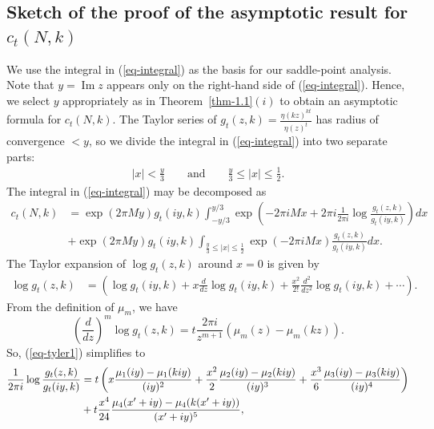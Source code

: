 \documentclass[11pt]{amsart}
\theoremstyle{plain}
\renewcommand{\Im}{\operatorname{Im}}
\numberwithin{equation}{section}
\begin{document}
	\subsection{\texorpdfstring{Sketch of the proof of the asymptotic result for $c_t(N,k)$}{}} 
	We use the integral in (\ref{eq-integral}) as the basis for our saddle-point analysis. 
	Note that $y=\Im z$ appears only on the right-hand side of (\ref{eq-integral}).
	Hence, we select $y$ appropriately as in Theorem~\ref{thm-1.1}$(i)$ to obtain an asymptotic formula for $c_t(N,k)$. 
	The Taylor series of $g_{t}(z,k)=\frac{\eta(kz)^{kt}}{\eta(z)^{t}}$ has radius of convergence $<y$, so we divide the integral in (\ref{eq-integral}) into two separate parts:
	\begin{align*}
		|x| < \frac{y}{3} 
		\qquad \text{and} \qquad 
		\frac{y}{3} \le |x| \le \frac{1}{2}.
	\end{align*}
	The integral in (\ref{eq-integral}) may be decomposed as
	\begin{equation}
		\begin{aligned}\label{eq-ptN1}
			c_{t}(N,k)&=\exp(2\pi My)g_{t}(iy,k)\int_{-y/3}^{y/3}\exp\left(-2\pi i Mx+2\pi i\frac{1}{2\pi i}\log\frac{g_{t}(z,k)}{g_{t}(iy,k)}\right)dx\\
			&+\exp(2\pi My)g_{t}(iy,k)\int_{\frac{y}{3}\le |x|\le \frac{1}{2}}\exp\left(-2\pi i Mx\right)\frac{g_{t}(z,k)}{g_{t}(iy,k)}dx.
		\end{aligned}
	\end{equation} 
	The Taylor expansion of $\log g_{t}(z,k)$ around $x=0$ is given by
	\begin{align}\label{eq-tyler1}
		\log g_{t}(z,k)&=\left(\log g_{t}(iy,k)+x\frac{d}{dz} \log g_{t}(iy,k)+\frac{x^{2}}{2!}\frac{d^{2}}{dz^{2}}\log g_{t}(iy,k)+\cdots\right).
	\end{align}
	From the definition of $\mu_m$, we have
	\begin{equation*}
		\left(\frac{d}{dz}\right)^{m}\log g_{t}(z,k)=t\frac{2\pi i}{z^{m+1}}(\mu_{m}(z)-\mu_m(kz)).
	\end{equation*}
	So, (\ref{eq-tyler1}) simplifies to
	\begin{align}\label{eq-taylor}
		\notag
		\frac{1}{2\pi i}\log \frac{g_{t}(z,k)}{g_{t}(iy,k)}
		&=t\left(x\frac{\mu_{1}(iy)-\mu_1(kiy)}{(iy)^{2}}+\frac{x^{2}}{2}\frac{\mu_{2}(iy)-\mu_2(kiy)}{(iy)^{3}}+\frac{x^{3}}{6}\frac{\mu_{3}(iy)-\mu_3(kiy)}{(iy)^{4}}\right)\\
		&+t\frac{x^{4}}{24}\frac{\mu_{4}(x^{\prime}+iy)-\mu_{4}(k(x^{\prime}+iy))}{(x^{\prime}+iy)^{5}},
	\end{align}
\end{document}
